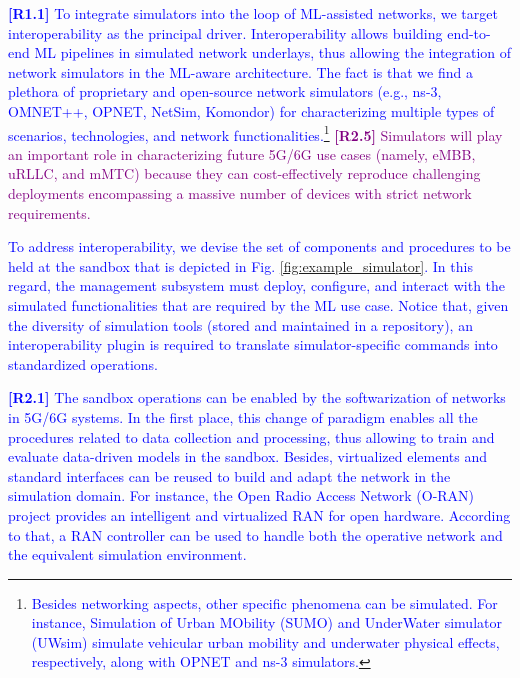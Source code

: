 \documentclass[journal]{IEEEtran}
\begin{document}
	\textcolor{blue}{\textbf{[R1.1]} To integrate simulators into the loop of ML-assisted networks, we target interoperability as the principal driver. Interoperability allows building end-to-end ML pipelines in simulated network underlays, thus allowing the integration of network simulators in the ML-aware architecture. The fact is that we find a plethora of proprietary and open-source network simulators (e.g., ns-3, OMNET++, OPNET, NetSim, Komondor) for characterizing multiple types of scenarios, technologies, and network functionalities.\footnote{\textcolor{blue}{Besides networking aspects, other specific phenomena can be simulated. For instance, Simulation of Urban MObility (SUMO) and UnderWater simulator (UWsim) simulate vehicular urban mobility and underwater physical effects, respectively, along with OPNET and ns-3 simulators.}}} \textcolor{purple}{\textbf{[R2.5]} Simulators will play an important role in characterizing future 5G/6G use cases (namely, eMBB, uRLLC, and mMTC) because they can cost-effectively reproduce challenging deployments encompassing a massive number of devices with strict network requirements.}
		
	\textcolor{blue}{To address interoperability, we devise the set of components and procedures to be held at the sandbox that is depicted in Fig. \ref{fig:example_simulator}. In this regard, the management subsystem must deploy, configure, and interact with the simulated functionalities that are required by the ML use case. Notice that, given the diversity of simulation tools (stored and maintained in a repository), an interoperability plugin is required to translate simulator-specific commands into standardized operations.} 
			
	\textcolor{blue}{\textbf{[R2.1]} The sandbox operations can be enabled by the softwarization of networks in 5G/6G systems. In the first place, this change of paradigm enables all the procedures related to data collection and processing, thus allowing to train and evaluate data-driven models in the sandbox. Besides, virtualized elements and standard interfaces can be reused to build and adapt the network in the simulation domain. For instance, the Open Radio Access Network (O-RAN) project provides an intelligent and virtualized RAN for open hardware. According to that, a RAN controller can be used to handle both the operative network and the equivalent simulation environment.} 
	
\end{document}
